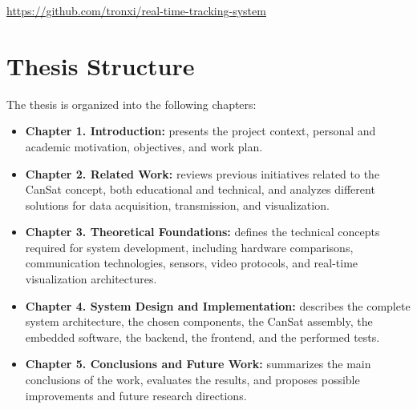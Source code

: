 \url{https://github.com/tronxi/real-time-tracking-system}

\section{Thesis Structure}
The thesis is organized into the following chapters:

\begin{itemize}
    \item \textbf{Chapter 1. Introduction:} presents the project context, personal and academic motivation, objectives, and work plan.
    \item \textbf{Chapter 2. Related Work:} reviews previous initiatives related to the CanSat concept, both educational and technical, and analyzes different solutions for data acquisition, transmission, and visualization.
    \item \textbf{Chapter 3. Theoretical Foundations:} defines the technical concepts required for system development, including hardware comparisons, communication technologies, sensors, video protocols, and real-time visualization architectures.
    \item \textbf{Chapter 4. System Design and Implementation:} describes the complete system architecture, the chosen components, the CanSat assembly, the embedded software, the backend, the frontend, and the performed tests.
    \item \textbf{Chapter 5. Conclusions and Future Work:} summarizes the main conclusions of the work, evaluates the results, and proposes possible improvements and future research directions.
\end{itemize}








